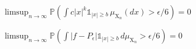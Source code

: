 \begin{lemma}
    \label{lem:fP_bound}
    \uses{}   %
    \notready
    $\limsup_{n \to \infty}\mathbb{P}\left(\int c|x|^k\mathbb{1}_{|x|\ge b}\,\mu_{\mathrm{X}_n}(dx) > \epsilon/6\right) = 0 $
\end{lemma}


\begin{lemma}
    \label{lem:fP_zero}
    \notready
    $\limsup_{n \to \infty}  \mathbb{P}\left(\int |f-P_\epsilon| \mathbb{1}_{|x|\ge b}\,d\mu_{\mathrm{X}_n} > \epsilon/6\right) = 0$
\end{lemma}